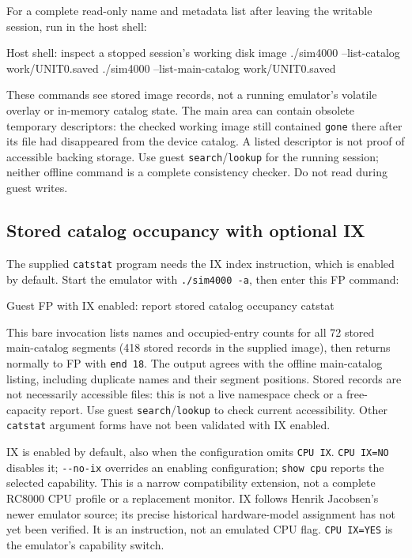 For a complete read-only name and metadata list after leaving the writable session, run in the host shell:

\begin{commandexample}[language=sh]{Host shell: inspect a stopped session's working disk image}
./sim4000 --list-catalog work/UNIT0.saved
./sim4000 --list-main-catalog work/UNIT0.saved
\end{commandexample}

These commands see stored image records, not a running emulator's volatile overlay or in-memory catalog state. The main area can contain obsolete temporary descriptors: the checked working image still contained \passthrough{\lstinline!gone!} there after its file had disappeared from the device catalog. A listed descriptor is not proof of accessible backing storage. Use guest \passthrough{\lstinline!search!}/\passthrough{\lstinline!lookup!} for the running session; neither offline command is a complete consistency checker. Do not read during guest writes.

\subsection{Stored catalog occupancy with optional IX}\label{stored-catalog-occupancy-with-optional-ix}

The supplied \passthrough{\lstinline!catstat!} program needs the IX index instruction, which is enabled by default. Start the emulator with \passthrough{\lstinline!./sim4000 -a!}, then enter this FP command:

\begin{commandexample}{Guest FP with IX enabled: report stored catalog occupancy}
catstat
\end{commandexample}

This bare invocation lists names and occupied-entry counts for all 72 stored main-catalog segments (418 stored records in the supplied image), then returns normally to FP with \passthrough{\lstinline!end 18!}. The output agrees with the offline main-catalog listing, including duplicate names and their segment positions. Stored records are not necessarily accessible files: this is not a live namespace check or a free-capacity report. Use guest \passthrough{\lstinline!search!}/\passthrough{\lstinline!lookup!} to check current accessibility. Other \passthrough{\lstinline!catstat!} argument forms have not been validated with IX enabled.

IX is enabled by default, also when the configuration omits \passthrough{\lstinline!CPU IX!}. \passthrough{\lstinline!CPU IX=NO!} disables it; \passthrough{\lstinline!--no-ix!} overrides an enabling configuration; \passthrough{\lstinline!show cpu!} reports the selected capability. This is a narrow compatibility extension, not a complete RC8000 CPU profile or a replacement monitor. IX follows Henrik Jacobsen's newer emulator source; its precise historical hardware-model assignment has not yet been verified. It is an instruction, not an emulated CPU flag. \passthrough{\lstinline!CPU IX=YES!} is the emulator's capability switch.

